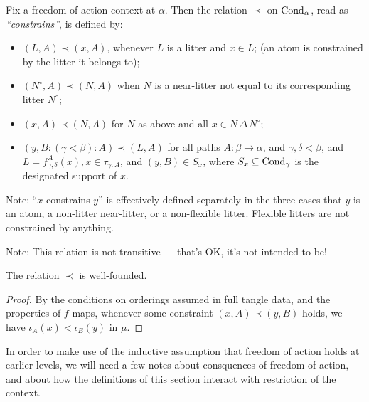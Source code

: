 \begin{definition}
  \label{def:constrains}
  Fix a freedom of action context at $\alpha$. Then the relation \( \prec \)  on $\mathrm{Cond}_\alpha$, read as \emph{“constrains”}, is defined by:
  \begin{itemize}
    \item \( (L, A) \prec (x, A) \), whenever \( L \) is a litter and \( x \in L \); (an atom is constrained by the litter it belongs to);
    \item \( (N^\circ, A) \prec (N, A) \) when \( N \) is a near-litter not equal to its corresponding litter \( N^\circ \);
    \item \( (x, A) \prec (N, A) \) for $N$ as above and all \( x \in N\,\Delta\, N^\circ \);
    \item \( (y, B:(\gamma<\beta):A) \prec (L, A) \) for all paths \( A \colon \beta \to \alpha \), and \( \gamma,\delta < \beta \), and \( L = f^A_{\gamma,\delta}(x), x \in \tau_{\gamma:A} \), and \( (y,B) \in S_x \), where \( S_x \subseteq \mathrm{Cond}_\gamma \) is the designated support of \( x \).
  \end{itemize}

  Note: “$x$ constrains $y$” is effectively defined separately in the three cases that $y$ is an atom, a non-litter near-litter, or a non-flexible litter. Flexible litters are not constrained by anything.

  Note: This relation is not transitive — that’s OK, it’s not intended to be!
\end{definition}

\begin{proposition}
  \label{prop:constrains-well-founded}
  \leanok
  The relation \( \prec \) is well-founded.
\end{proposition}
\begin{proof}
  By the conditions on orderings assumed in full tangle data, and the properties of $f$-maps, whenever some constraint \( (x, A) \prec (y,B) \) holds, we have \( \iota_A(x) < \iota_B(y) \) in \( \mu \).
\end{proof}

In order to make use of the inductive assumption that freedom of action holds at earlier levels, we will need a few notes about consquences of freedom of action, and about how the definitions of this section interact with restriction of the context.

